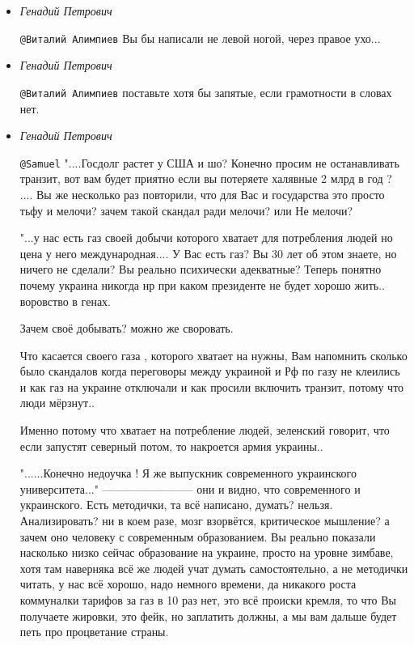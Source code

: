 \begin{itemize}
\begin{itemize}
\item \emph{Генадий Петрович}

\verb|@Виталий Алимпиев|  Вы бы написали не левой ногой, через правое ухо...

\item \emph{Генадий Петрович}

\verb|@Виталий Алимпиев|  поставьте хотя бы запятые, если грамотности в словах нет.


\item \emph{Генадий Петрович}

\verb|@Samuel|  "....Госдолг растет у США и шо? Конечно просим не останавливать
транзит, вот вам будет приятно если вы потеряете халявные 2 млрд в год ? ....
Вы же несколько раз повторили, что для Вас и государства это просто тьфу и
мелочи? зачем такой скандал ради мелочи? или Не мелочи?

"...у нас есть газ своей добычи которого хватает для потребления людей но цена
у него международная.... У Вас есть газ? Вы 30 лет об этом знаете, но ничего
не сделали? Вы реально психически адекватные? Теперь понятно почему украина
никогда нр при каком президенте не будет хорошо жить.. воровство в генах.

Зачем своё добывать? можно же своровать.

Что касается  своего газа , которого хватает на нужны, Вам напомнить сколько
было скандалов когда переговоры между украиной и Рф по газу не клеились и как
газ на украине отключали и как просили включить транзит, потому что люди
мёрзнут..

Именно потому что хватает на потребление людей, зеленский говорит, что если
запустят северный потом, то накроется армия украины..

"......Конечно недоучка ! Я же выпускник современного украинского
университета..." ------------------------ они и видно, что современного и
украинского. Есть методички, та всё написано, думать? нельзя. Анализировать? ни
в коем разе, мозг взорвётся, критическое мышление? а зачем оно человеку с
современным образованием. Вы реально показали насколько низко сейчас
образование на украине, просто на уровне зимбаве, хотя там наверняка всё же
людей учат думать самостоятельно, а не методички читать, у нас всё хорошо, надо
немного времени, да никакого роста коммуналки тарифов за газ в 10 раз нет, это
всё происки кремля, то что Вы получаете жировки, это фейк, но заплатить должны,
а мы вам дальше будет петь про процветание страны.


\end{itemize}
\end{itemize}
